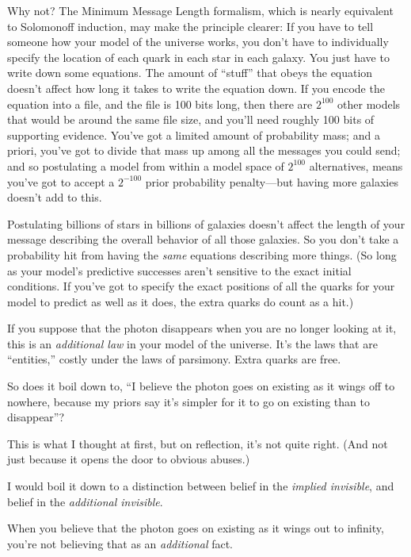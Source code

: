 {
 Why not? The Minimum Message Length formalism, which is nearly
equivalent to Solomonoff induction, may make the principle clearer: If
you have to tell someone how your model of the universe works, you
don't have to individually specify the location of each
quark in each star in each galaxy. You just have to write down some
equations. The amount of ``stuff''
that obeys the equation doesn't affect how long it
takes to write the equation down. If you encode the equation into a
file, and the file is 100 bits long, then there are
$2^{100}$ other models that would be around the same file
size, and you'll need roughly 100 bits of supporting
evidence. You've got a limited amount of probability
mass; and a priori, you've got to divide that mass up
among all the messages you could send; and so postulating a model from
within a model space of $2^{100}$ alternatives, means
you've got to accept a $2^{-100}$ prior
probability penalty---but having more galaxies doesn't
add to this.}

{
 Postulating billions of stars in billions of galaxies
doesn't affect the length of your message describing
the overall behavior of all those galaxies. So you
don't take a probability hit from having the
\textit{same} equations describing more things. (So long as your
model's predictive successes aren't
sensitive to the exact initial conditions. If you've
got to specify the exact positions of all the quarks for your model to
predict as well as it does, the extra quarks do count as a hit.)}

{
 If you suppose that the photon disappears when you are no longer
looking at it, this is an \textit{additional law} in your model of the
universe. It's the laws that are
``entities,'' costly under the laws
of parsimony. Extra quarks are free.}

{
 So does it boil down to, ``I believe the photon
goes on existing as it wings off to nowhere, because my priors say
it's simpler for it to go on existing than to
disappear''?}

{
 This is what I thought at first, but on reflection,
it's not quite right. (And not just because it opens
the door to obvious abuses.)}

{
 I would boil it down to a distinction between belief in the
\textit{implied invisible}, and belief in the \textit{additional
invisible}.}

{
 When you believe that the photon goes on existing as it wings out
to infinity, you're not believing that as an
\textit{additional} fact.}

